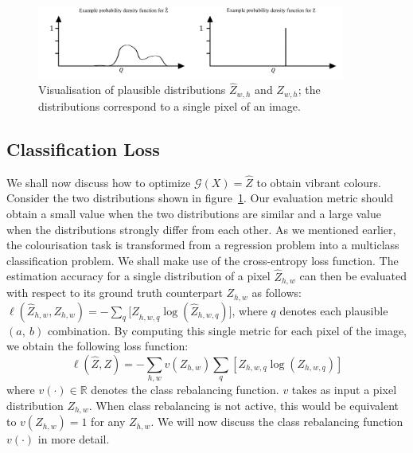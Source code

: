 \documentclass{article}
\begin{document}
\begin{figure}[h]
    \centering
    \includegraphics[width=0.9\textwidth]{GRAPHS/density.png}
    \caption{
        Visualisation of plausible distributions ${\hat{Z}}_{w,h}$ and $Z_{w,h}$; the distributions correspond to a single pixel of an image.}
    \label{fig:density}
\end{figure}

\subsection{Classification Loss}
We shall now discuss how to optimize $\mathcal{G}\left(X\right)=\hat{Z}$ to obtain vibrant colours. Consider the two distributions shown in figure~\ref{fig:density}. Our evaluation metric should obtain a small value when the two distributions are similar and a large value when the distributions strongly differ from each other. As we mentioned earlier, the colourisation task is transformed from a regression problem into a multiclass classification problem. We shall make use of the cross-entropy loss function. The estimation accuracy for a single distribution of a pixel ${\hat{Z}}_{h,w}$ can then be evaluated with respect to its ground truth counterpart $Z_{h,w}$ as follows: $\ell\left({\hat{Z}}_{h,w}, Z_{h,w}\right)=-\sum_q{[Z}_{h,w,q}\log({\hat{Z}}_{h,w,q})]$, where $q$ denotes each plausible $(a,\ b)$ combination. By computing this single metric for each pixel of the image, we obtain the following loss function:
\[\ell\left(\hat{Z},Z\right)=-\sum_{h,w}v(Z_{h,w})\sum_q[Z_{h,w,q}\log(Z_{h,w,q})]\]
where $v\left(\cdot\right)\in \mathbb{R}$ denotes the class rebalancing function. $v$ takes as input a pixel distribution $Z_{h,w}$. When class rebalancing is not active, this would be equivalent to $v\left(Z_{h,w}\right)=1$ for any $Z_{h,w}$. We will now discuss the class rebalancing function $v\left(\cdot\right)$ in more detail.
\end{document}

